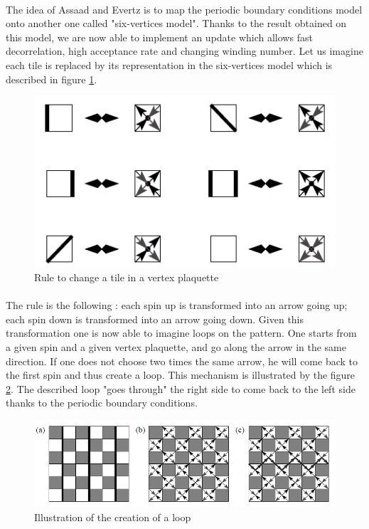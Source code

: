 \documentclass[a4paper,12pt,twoside]{article}
\begin{document}
	\paragraph{}The idea of Assaad and Evertz is to map the periodic boundary conditions model onto another one called "six-vertices model". Thanks to the result obtained on this model, we are now able to implement an update which allows fast decorrelation, high acceptance rate and changing winding number.
	Let us imagine each tile is replaced by its representation in the six-vertices model which is described in figure \ref{six_vertex}.
	\begin{figure}[!h]
		\centering
		\includegraphics[]{six_vertex.png}
		\caption{Rule to change a tile in a vertex plaquette}
		\label{six_vertex}
	\end{figure}

	\paragraph{} The rule is the following : each spin up is transformed into an arrow going up; each spin down is transformed into an arrow going down. 
	Given this transformation one is now able to imagine loops on the pattern. One starts from a given spin and a given vertex plaquette, and go along the arrow in the same direction. If one does not choose two times the same arrow, he will come back to the first spin and thus create a loop. This mechanism is illustrated by the figure \ref{creating_loop}. The described loop "goes through" the right side to come back to the left side thanks to the periodic boundary conditions.
	\begin{figure}[!h]
		\centering
		\includegraphics[]{creating_loop.png}
		\caption{Illustration of the creation of a loop}
		\label{creating_loop}
	\end{figure}
\end{document}
